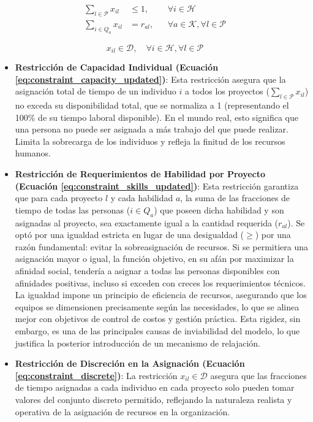\documentclass[conference]{IEEEtran}
\begin{document}
\begin{align}
    \sum_{l \in \mathcal{P}} x_{il}  &\leq 1, && \forall i \in \mathcal{H} \label{eq:constraint_capacity_updated} \\
    \sum_{i \in Q_a} x_{il}          &= r_{al}, && \forall a \in \mathcal{K}, \forall l \in \mathcal{P} \label{eq:constraint_skills_updated}
\end{align}

\begin{equation}
    x_{il} \in \mathcal{D}, \quad \forall i \in \mathcal{H}, \forall l \in \mathcal{P}
    \label{eq:constraint_discrete}
\end{equation}

\begin{itemize}
    \item \textbf{Restricción de Capacidad Individual (Ecuación \ref{eq:constraint_capacity_updated})}: Esta restricción asegura que la asignación total de tiempo de un individuo \(i\) a todos los proyectos (\(\sum_{l \in \mathcal{P}} x_{il}\)) no exceda su disponibilidad total, que se normaliza a 1 (representando el 100\% de su tiempo laboral disponible). En el mundo real, esto significa que una persona no puede ser asignada a más trabajo del que puede realizar. Limita la sobrecarga de los individuos y refleja la finitud de los recursos humanos.

    \item \textbf{Restricción de Requerimientos de Habilidad por Proyecto (Ecuación \ref{eq:constraint_skills_updated})}: Esta restricción garantiza que para cada proyecto \(l\) y cada habilidad \(a\), la suma de las fracciones de tiempo de todas las personas (\(i \in Q_a\)) que poseen dicha habilidad y son asignadas al proyecto, sea exactamente igual a la cantidad requerida (\(r_{al}\)). Se optó por una igualdad estricta en lugar de una desigualdad (\(\geq\)) por una razón fundamental: evitar la sobreasignación de recursos. Si se permitiera una asignación mayor o igual, la función objetivo, en su afán por maximizar la afinidad social, tendería a asignar a todas las personas disponibles con afinidades positivas, incluso si exceden con creces los requerimientos técnicos. La igualdad impone un principio de eficiencia de recursos, asegurando que los equipos se dimensionen precisamente según las necesidades, lo que se alinea mejor con objetivos de control de costos y gestión práctica. Esta rigidez, sin embargo, es una de las principales causas de inviabilidad del modelo, lo que justifica la posterior introducción de un mecanismo de relajación.

    \item \textbf{Restricción de Discreción en la Asignación (Ecuación \ref{eq:constraint_discrete})}: La restricción \(x_{il} \in \mathcal{D}\) asegura que las fracciones de tiempo asignadas a cada individuo en cada proyecto solo pueden tomar valores del conjunto discreto permitido, reflejando la naturaleza realista y operativa de la asignación de recursos en la organización.

\end{itemize}
\end{document}
